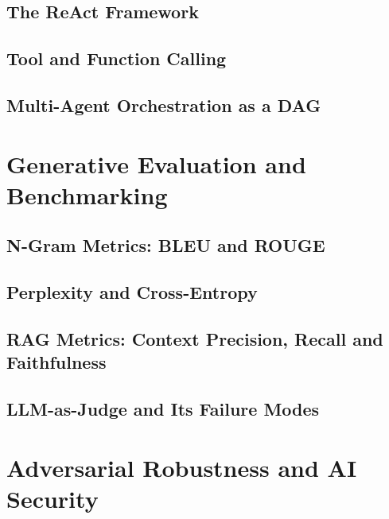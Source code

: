 \subsection{The ReAct Framework}

\subsection{Tool and Function Calling}

\subsection{Multi-Agent Orchestration as a DAG}


\section{Generative Evaluation and Benchmarking}
\label{sec:gen-eval}

\subsection{N-Gram Metrics: BLEU and ROUGE}


\subsection{Perplexity and Cross-Entropy}


\subsection{RAG Metrics: Context Precision, Recall and Faithfulness}

\subsection{LLM-as-Judge and Its Failure Modes}

\section{Adversarial Robustness and AI Security}
\label{sec:ai-security}

